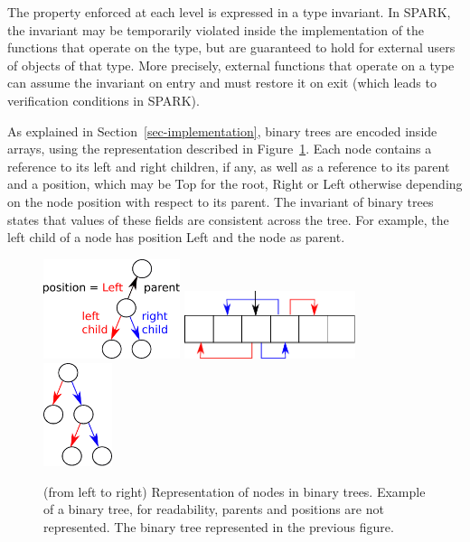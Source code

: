 \documentclass{llncs}
\begin{document}
The property enforced at each level is expressed in a type invariant. In SPARK,
the invariant may be temporarily violated inside the implementation of the
functions that operate on the type, but are guaranteed to hold for external
users of objects of that type. More precisely, external functions that operate
on a type can assume the invariant on entry and must restore it on exit (which
leads to verification conditions in SPARK).

As explained in Section~\ref{sec-implementation}, binary trees are encoded
inside arrays, using the representation described in Figure~\ref{fig-binary}.
Each node contains a reference to its left and right children, if any, as well
as a reference to its parent and a position, which may be Top for the root,
Right or Left otherwise depending on the node position with respect to its
parent. The invariant of binary trees states that values of these fields are
consistent across the tree. For example, the left child of a node has position
Left and the node as parent.

\begin{figure}[ht]
\begin{center}
\includegraphics[width=4cm]{tree_structure.pdf}\hfill
\includegraphics[width=5cm]{binary_1.pdf}\hfill
\includegraphics[width=2cm]{binary_2.pdf}
\caption{(from left to right) Representation of nodes in binary trees.
Example of a binary tree, for readability, parents and positions are not represented.
The binary tree represented in the previous figure.}
\label{fig-binary}
\end{center}
\end{figure}
\end{document}
